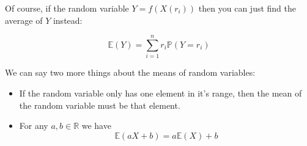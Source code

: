 Of course, if the random variable $Y = f(X(r_i))$ then you can just find
the average of $Y$ instead:

\begin{dmath}
	\mathbb{E}(Y) = {\sum\limits_{i=1}^{n} r_i \mathbb{P}(Y = r_i)}
\end{dmath}

We can say two more things about the means of random variables:

\begin{itemize}
	\item If the random variable only has one element in it's range, then the mean of the random variable must be that element.
	\item For any $a, b \in \mathbb{R}$ we have
	\begin{dmath}
		\mathbb{E}(aX + b) = a\mathbb{E}(X) + b
	\end{dmath}
\end{itemize}